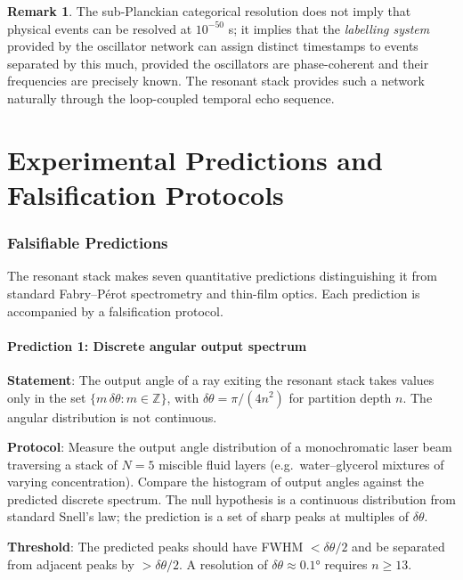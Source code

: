 \documentclass[11pt,twocolumn,a4paper]{article}
\theoremstyle{plain}
\theoremstyle{definition}
\newtheorem{remark}[theorem]{Remark}
\theoremstyle{remark}
\newcommand{\Z}{\mathbb{Z}}
\begin{document}
\begin{remark}
The sub-Planckian categorical resolution does not imply that physical events can be resolved at $10^{-50}$ s; it implies that the \emph{labelling system} provided by the oscillator network can assign distinct timestamps to events separated by this much, provided the oscillators are phase-coherent and their frequencies are precisely known. The resonant stack provides such a network naturally through the loop-coupled temporal echo sequence.
\end{remark}

\part{Experimental Predictions and Falsification Protocols}

\section{Falsifiable Predictions}
\label{sec:predictions}

The resonant stack makes seven quantitative predictions distinguishing it from standard Fabry--P\'{e}rot spectrometry and thin-film optics. Each prediction is accompanied by a falsification protocol.

\subsection{Prediction 1: Discrete angular output spectrum}

\textbf{Statement}: The output angle of a ray exiting the resonant stack takes values only in the set $\{m\,\delta\theta : m\in\Z\}$, with $\delta\theta=\pi/(4n^2)$ for partition depth $n$. The angular distribution is not continuous.

\textbf{Protocol}: Measure the output angle distribution of a monochromatic laser beam traversing a stack of $N=5$ miscible fluid layers (e.g.\ water--glycerol mixtures of varying concentration). Compare the histogram of output angles against the predicted discrete spectrum. The null hypothesis is a continuous distribution from standard Snell's law; the prediction is a set of sharp peaks at multiples of $\delta\theta$.

\textbf{Threshold}: The predicted peaks should have FWHM $<\delta\theta/2$ and be separated from adjacent peaks by $>\delta\theta/2$. A resolution of $\delta\theta\approx 0.1°$ requires $n\geq 13$.
\end{document}
